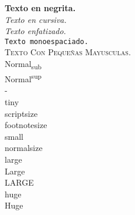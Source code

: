 \documentclass{article}
\begin{document}
\textbf{Texto en negrita.}\\

\textit{Texto en cursiva.}\\

\emph{Texto enfatizado.}\\

\texttt{Texto monoespaciado.}\\

\textsc{Texto Con Peque\~nas Mayusculas.}\\

Normal\textsubscript{sub}\\

Normal\textsuperscript{sup}\\

-\\
\tiny
tiny\\
\scriptsize
scriptsize\\
\footnotesize
footnotesize\\
\small
small\\
\normalsize
normalsize\\
\large
large\\
\Large
Large\\
\LARGE
LARGE\\
\huge
huge\\
\Huge
Huge\\
\end{document}
